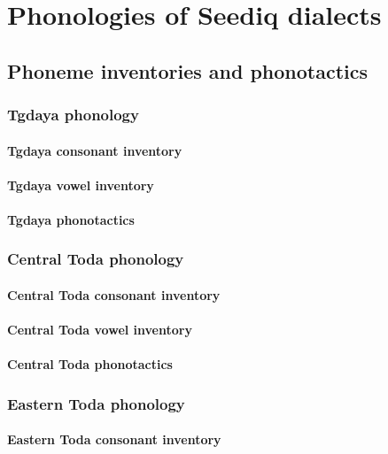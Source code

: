 \chapter{Phonologies of Seediq dialects}
\lipsum[1]

\section{Phoneme inventories and phonotactics}

\subsection{Tgdaya phonology}
\lipsum[1]

\subsubsection{Tgdaya consonant inventory}
\subsubsection{Tgdaya vowel inventory}
\subsubsection{Tgdaya phonotactics}

\subsection{Central Toda phonology}
\lipsum[1]

\subsubsection{Central Toda consonant inventory}
\subsubsection{Central Toda vowel inventory}
\subsubsection{Central Toda phonotactics}

\subsection{Eastern Toda phonology}
\lipsum[1]

\subsubsection{Eastern Toda consonant inventory}
